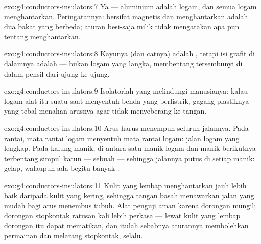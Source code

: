 \begin{solution}{exo:g4:conductors-insulators:7}
Ya --- aluminium adalah logam, dan semua logam menghantarkan.
Peringatannya: bersifat magnetis dan menghantarkan adalah dua bakat
yang berbeda; aturan besi-saja milik  tidak mengatakan apa pun
tentang menghantarkan.
\end{solution}

\begin{solution}{exo:g4:conductors-insulators:8}
Kayunya (dan catnya) adalah , tetapi isi grafit di dalamnya
adalah  ---  bukan logam yang langka, membentang
tersembunyi di dalam pensil dari ujung ke ujung.
\end{solution}

\begin{solution}{exo:g4:conductors-insulators:9}
Isolatorlah yang melindungi manusianya: kalau logam alat itu suatu
saat menyentuh benda yang berlistrik, gagang plastiknya yang tebal
menahan arusnya agar tidak menyeberang ke tangan.
\end{solution}

\begin{solution}{exo:g4:conductors-insulators:10}
Arus harus menempuh seluruh jalannya. Pada rantai, mata rantai logam
menyentuh mata rantai logam: jalan logam yang lengkap. Pada kalung
manik, di antara satu manik logam dan manik berikutnya terbentang
simpul katun --- sebuah  --- sehingga jalannya putus di setiap
manik: gelap, walaupun ada begitu banyak .
\end{solution}

\begin{solution}{exo:g4:conductors-insulators:11}
Kulit yang lembap menghantarkan jauh lebih baik daripada kulit yang
kering, sehingga tangan basah menawarkan jalan yang mudah bagi arus
menembus tubuh. Alat penguji  aman karena dorongan 
mungil; dorongan stopkontak ratusan kali lebih perkasa --- lewat kulit
yang lembap dorongan itu dapat mematikan, dan itulah sebabnya
aturannya membolehkan permainan  dan melarang stopkontak,
selalu.
\end{solution}
